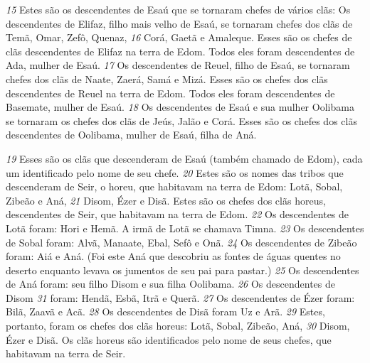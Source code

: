 \bigskip   
\textit{\tiny 15}
Estes são os descendentes de Esaú que se tornaram chefes de vários clãs:
Os descendentes de Elifaz, filho mais velho de Esaú, se tornaram chefes dos clãs
 de Temã, Omar, Zefô, Quenaz, 
\textit{\tiny 16}
Corá, Gaetã e Amaleque. Esses são os chefes de
 clãs descendentes de Elifaz na terra de Edom. Todos eles foram descendentes de
 Ada, mulher de Esaú.
\textit{\tiny 17}
Os descendentes de Reuel, filho de Esaú, se tornaram chefes dos clãs de Naate,
 Zaerá, Samá e Mizá. Esses são os chefes dos clãs descendentes de Reuel na terra
 de Edom. Todos eles foram descendentes de Basemate, mulher de Esaú.
\textit{\tiny 18}
Os descendentes de Esaú e sua mulher Oolibama se tornaram os chefes dos clãs
 de Jeús, Jalão e Corá. Esses são os chefes dos clãs descendentes de Oolibama,
 mulher de Esaú, filha de Aná.

\bigskip   
\textit{\tiny 19}
Esses são os clãs que descenderam de Esaú (também chamado de Edom), cada
um identificado pelo nome de seu chefe.
\textit{\tiny 20}
Estes são os nomes das tribos que descenderam de Seir, o horeu, que habitavam
na terra de Edom: Lotã, Sobal, Zibeão e Aná, 
\textit{\tiny 21}
Disom, Ézer e Disã. Estes são os
chefes dos clãs horeus, descendentes de Seir, que habitavam na terra de Edom.
\textit{\tiny 22}
Os  descendentes de Lotã foram: Hori e Hemã. A irmã de Lotã se chamava
 Timna.
\textit{\tiny 23}
Os descendentes de Sobal foram: Alvã, Manaate, Ebal, Sefô e Onã.
\textit{\tiny 24}
Os descendentes de Zibeão foram: Aiá e Aná. (Foi este Aná que descobriu as
 fontes de águas quentes no deserto enquanto levava os jumentos de seu pai para
 pastar.)
\textit{\tiny 25}
Os descendentes de Aná foram: seu filho Disom e sua filha Oolibama.
\textit{\tiny 26}
Os descendentes de Disom
\textit{\tiny 31}
 foram: Hendã, Esbã, Itrã e Querã.
\textit{\tiny 27}
Os descendentes de Ézer foram: Bilã, Zaavã e Acã.
\textit{\tiny 28}
Os descendentes de Disã foram Uz e Arã.
\textit{\tiny 29}
Estes, portanto, foram os chefes dos clãs horeus: Lotã, Sobal, Zibeão, Aná,
\textit{\tiny 30}
Disom, Ézer e Disã. Os clãs horeus são identificados pelo nome de seus chefes,
que habitavam na terra de Seir.



